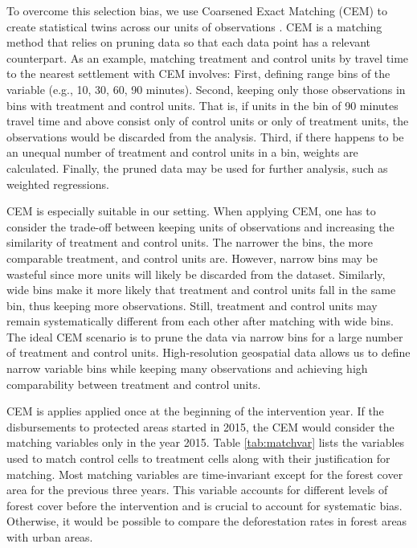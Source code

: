 \documentclass{article}
\begin{document}
To overcome this selection bias, we use Coarsened Exact Matching (CEM) to create statistical twins across our units of observations \citep{iacus2012causal, blackwell2009cem}. CEM is a matching method that relies on pruning data so that each data point has a relevant counterpart. As an example, matching treatment and control units by travel time to the nearest settlement with CEM involves: First, defining range bins of the variable (e.g., 10, 30, 60, 90 minutes). Second, keeping only those observations in bins with treatment and control units. That is, if units in the bin of 90 minutes travel time and above consist only of control units or only of treatment units, the observations would be discarded from the analysis. Third, if there happens to be an unequal number of treatment and control units in a bin, weights are calculated. Finally, the pruned data may be used for further analysis, such as weighted regressions.

CEM is especially suitable in our setting. When applying CEM, one has to consider the trade-off between keeping units of observations and increasing the similarity of treatment and control units. The narrower the bins, the more comparable treatment, and control units are. However, narrow bins may be wasteful since more units will likely be discarded from the dataset. Similarly, wide bins make it more likely that treatment and control units fall in the same bin, thus keeping more observations. Still, treatment and control units may remain systematically different from each other after matching with wide bins. The ideal CEM scenario is to prune the data via narrow bins for a large number of treatment and control units. High-resolution geospatial data allows us to define narrow variable bins while keeping many observations and achieving high comparability between treatment and control units.

CEM is applies applied once at the beginning of the intervention year. If the disbursements to protected areas started in 2015, the CEM would consider the matching variables only in the year 2015. Table \ref{tab:matchvar} lists the variables used to match control cells to treatment cells along with their justification for matching. Most matching variables are time-invariant except for the forest cover area for the previous three years. This variable accounts for different levels of forest cover before the intervention and is crucial to account for systematic bias. Otherwise, it would be possible to compare the deforestation rates in forest areas with urban areas.
\end{document}
